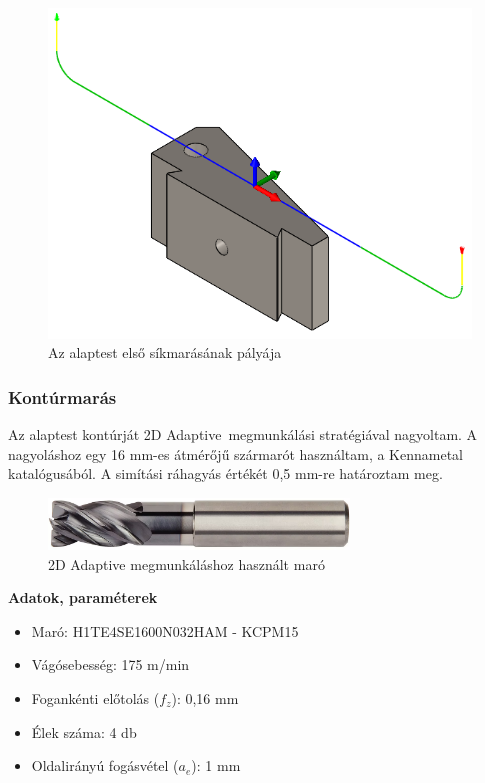 \documentclass[12pt,a4paper,oneside]{report}
\begin{document}
\begin{figure}[H]
    \centering
    \includegraphics[width=12cm]{figures/alaptest_facemill_1.png}
    \caption{Az alaptest első síkmarásának pályája}
    \label{Fig:alaptest_facemill_1}
\end{figure}

\subsubsection{Kontúrmarás}
Az alaptest kontúrját \glqq 2D Adaptive\grqq\ megmunkálási stratégiával nagyoltam. A nagyoláshoz egy 16 mm-es átmérőjű szármarót használtam, a Kennametal katalógusából. A simítási ráhagyás értékét 0,5 mm-re határoztam meg.

\begin{figure}[H]
    \centering
    \includegraphics[width=8cm]{figures/d10_flatmill.png}
    \caption{2D Adaptive megmunkáláshoz használt maró}
    \label{Fig:d16_flatmill}
\end{figure}

\textbf{Adatok, paraméterek}
\begin{itemize}
    \item Maró: H1TE4SE1600N032HAM - KCPM15
    \item Vágósebesség: 175 m/min
    \item Fogankénti előtolás ($f_z$): 0,16 mm
    \item Élek száma: 4 db
    \item Oldalirányú fogásvétel ($a_e$): 1 mm
\end{itemize}
\end{document}
